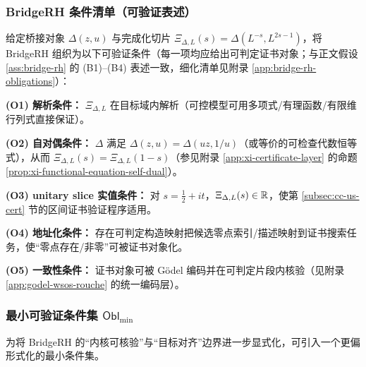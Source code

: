 \subsubsection{BridgeRH 条件清单（可验证表述）}\label{subsubsec:cc-bridge-obligations}
给定桥接对象 $\Delta(z,u)$ 与完成化切片 $\Xi_{\Delta,L}(s)=\Delta(L^{-s},L^{2s-1})$，将 BridgeRH 组织为以下可验证条件（每一项均应给出可判定证书对象；与正文假设 \ref{ass:bridge-rh} 的 (B1)--(B4) 表述一致，细化清单见附录 \ref{app:bridge-rh-obligations}）：\par
\noindent\textbf{(O1) 解析条件：} $\Xi_{\Delta,L}$ 在目标域内解析（可控模型可用多项式/有理函数/有限维行列式直接保证）。\par
\noindent\textbf{(O2) 自对偶条件：} $\Delta$ 满足 $\Delta(z,u)=\Delta(uz,1/u)$（或等价的可检查代数恒等式），从而 $\Xi_{\Delta,L}(s)=\Xi_{\Delta,L}(1-s)$（参见附录 \ref{app:xi-certificate-layer} 的命题 \ref{prop:xi-functional-equation-self-dual}）。\par
\noindent\textbf{(O3) unitary slice 实值条件：} 对 $s=\frac12+it$，$\Xi_{\Delta,L}(s)\in\mathbb{R}$，使第 \ref{subsec:cc-us-cert} 节的区间证书验证程序适用。\par
\noindent\textbf{(O4) 地址化条件：} 存在可判定构造映射把候选零点索引/描述映射到证书搜索任务，使“零点存在/非零”可被证书对象化。\par
\noindent\textbf{(O5) 一致性条件：} 证书对象可被 Gödel 编码并在可判定片段内核验（见附录 \ref{app:godel-wsos-rouche} 的统一编码层）。

\subsubsection{最小可验证条件集 \texorpdfstring{$\mathsf{Obl}_{\min}$}{Obl\_min}}\label{subsubsec:cc-oblmin}
为将 BridgeRH 的“内核可核验”与“目标对齐”边界进一步显式化，可引入一个更偏形式化的最小条件集。

